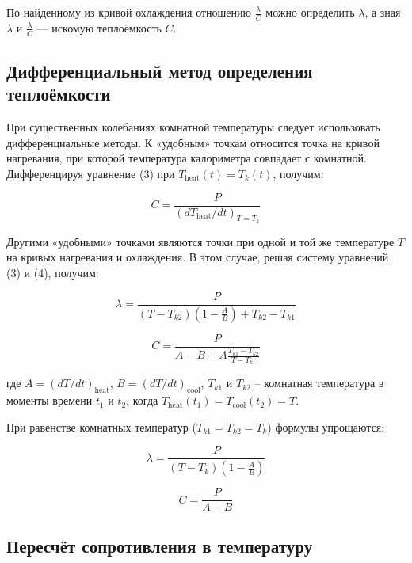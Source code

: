 \documentclass{article}
\begin{document}
По найденному из кривой охлаждения отношению $\frac{\lambda}{C}$ можно определить $\lambda$, а зная $\lambda$ и $\frac{\lambda}{C}$ — искомую теплоёмкость $C$.

\subsection*{Дифференциальный метод определения теплоёмкости}

При существенных колебаниях комнатной температуры следует использовать дифференциальные методы. К «удобным» точкам относится точка на кривой нагревания, при которой температура калориметра совпадает с комнатной. Дифференцируя уравнение (3) при $T_{\text{heat}}(t) = T_k(t)$, получим:

\begin{equation}
C = \frac{P}{(dT_{\text{heat}}/dt)_{T=T_k}} \tag{7}
\end{equation}

Другими «удобными» точками являются точки при одной и той же температуре $T$ на кривых нагревания и охлаждения. В этом случае, решая систему уравнений (3) и (4), получим:

\begin{equation}
\lambda = \frac{P}{(T - T_{k2})(1 - \frac{A}{B}) + T_{k2} - T_{k1}} \tag{8}
\end{equation}

\begin{equation}
C = \frac{P}{A - B + A \frac{T_{k1} - T_{k2}}{T - T_{k1}}} \tag{9}
\end{equation}

где $A = (dT/dt)_{\text{heat}}$, $B = (dT/dt)_{\text{cool}}$, $T_{k1}$ и $T_{k2}$ – комнатная температура в моменты времени $t_1$ и $t_2$, когда $T_{\text{heat}}(t_1) = T_{\text{cool}}(t_2) = T$.

При равенстве комнатных температур ($T_{k1} = T_{k2} = T_k$) формулы упрощаются:

\begin{equation}
\lambda = \frac{P}{(T - T_k)(1 - \frac{A}{B})} \tag{10}
\end{equation}

\begin{equation}
C = \frac{P}{A - B} \tag{11}
\end{equation}

\subsection*{Пересчёт сопротивления в температуру}
\end{document}
